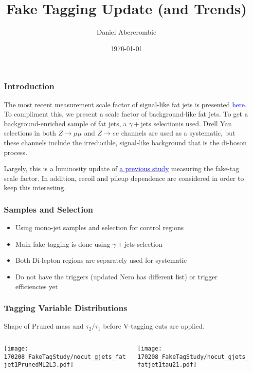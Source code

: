 \documentclass{beamer}
\author[D. Abercrombie]{
  Daniel Abercrombie
}
\title{\bf \sffamily Fake Tagging Update (and Trends)}
\date{\today}
\begin{document}
\begin{frame}[nonumbering]
  \titlepage
\end{frame}

\begin{frame}
  \frametitle{Introduction}

  The most recent measurement scale factor of signal-like fat jets is presented
  \href{http://t3serv001.mit.edu/~dabercro/docs/WTagStudy/dabercro_WTagStudy_170127.pdf}
       {\textcolor{blue}{here}}.
  To compliment this, we present a scale factor of background-like fat jets.
  To get a background-enriched sample of fat jets, a $\gamma + $jets selectionis used.
  Drell Yan selections in both $Z\rightarrow\mu\mu$ and $Z\rightarrow ee$ channels are used
  as a systematic, but these channels include the irreducible, signal-like background
  that is the di-boson process.

  \vspace{12pt}

  Largely, this is a luminosity update of
  \href{http://t3serv001.mit.edu/~dabercro/docs/FakeTagStudy/dabercro_FakeTagStudy_161028.pdf}
       {\textcolor{blue}{a previous study}}
  measuring the fake-tag scale factor.
  In addition, recoil and pileup dependence are considered in order to keep this interesting.

\end{frame}

\begin{frame}
  \frametitle{Samples and Selection}

  \begin{itemize}
  \item Using mono-jet samples and selection for control regions
  \item Main fake tagging is done using $\gamma + $jets selection
  \item Both Di-lepton regions are separately used for systematic
  \item Do not have the triggers (updated Nero has different list) or trigger efficiencies yet
  \end{itemize}

\end{frame}

\begin{frame}
  \frametitle{Tagging Variable Distributions}

  Shape of Pruned mass and $\tau_2/\tau_1$ before V-tagging cuts are applied.

  \vspace{12pt}

  \begin{columns}
    \begin{column}{0.5\linewidth}
      \texttt{[image: 170208\_FakeTagStudy/nocut\_gjets\_fatjet1PrunedML2L3.pdf]}
    \end{column}
    \begin{column}{0.5\linewidth}
      \texttt{[image: 170208\_FakeTagStudy/nocut\_gjets\_fatjet1tau21.pdf]}
    \end{column}
  \end{columns}

\end{frame}
\end{document}
